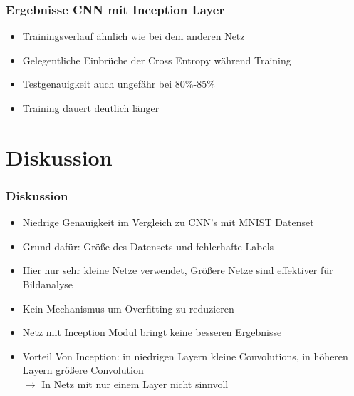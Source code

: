 \documentclass{beamer}
\begin{document}
\begin{frame}
	\frametitle{Ergebnisse CNN mit Inception Layer}
	\begin{figure}
		\label{fig:inception_results}
	\end{figure}
	\begin{itemize}
		\item Trainingsverlauf ähnlich wie bei dem anderen Netz
		\item Gelegentliche Einbrüche der Cross Entropy während Training
		\item Testgenauigkeit auch ungefähr bei 80\%-85\%
		\item Training dauert deutlich länger
	\end{itemize}
\end{frame}

\section{Diskussion}

\begin{frame}
	\frametitle{Diskussion}
	\begin{itemize}
		\item Niedrige Genauigkeit im Vergleich zu CNN's mit MNIST Datenset
		\item Grund dafür: Größe des Datensets und fehlerhafte Labels
		\item Hier nur sehr kleine Netze verwendet, Größere Netze sind effektiver für Bildanalyse
		\item Kein Mechanismus um Overfitting zu reduzieren
		\item Netz mit Inception Modul bringt keine besseren Ergebnisse
		\item Vorteil Von Inception: in niedrigen Layern kleine Convolutions, in höheren Layern größere Convolution\\
		$\rightarrow$ In Netz mit nur einem Layer nicht sinnvoll
	\end{itemize}
\end{frame}
\end{document}
